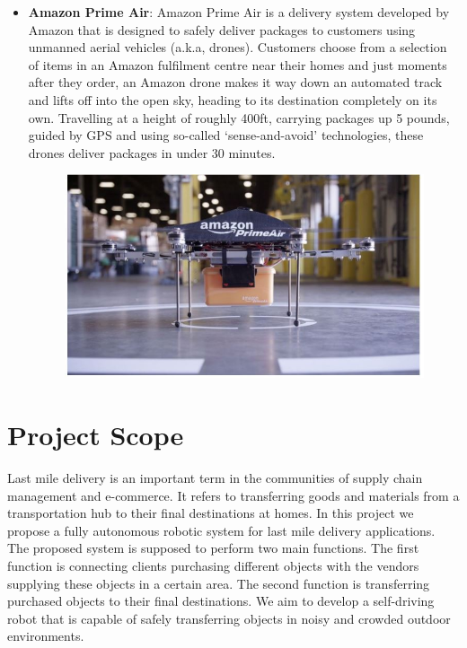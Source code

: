 \begin{itemize}
\par
 \item \textbf{Amazon Prime Air}:
Amazon Prime Air is a delivery system developed by Amazon that is designed to safely deliver packages to customers using unmanned aerial vehicles (a.k.a, drones). Customers choose from a selection of items in an Amazon fulfilment centre near their homes and just moments after they order, an Amazon drone makes it way down an automated track and lifts off into the open sky, heading to its destination completely on its own. Travelling at a height of roughly 400ft, carrying packages up 5 pounds, guided by GPS and using so-called ‘sense-and-avoid’ technologies, these drones deliver packages in under 30 minutes. \cite{web027}
\begin{figure}[H]%
    \center%
    \includegraphics[width=.5\textwidth]{images/Alaa/prime.JPG}%
  \end{figure}
\end{itemize}

\section{Project Scope}
\hspace{2cm} Last mile delivery is an important term in the communities of supply chain management and e-commerce. It refers to transferring goods and materials from a transportation hub to their final destinations at homes. In this project we propose a fully autonomous robotic system for last mile delivery applications. The proposed system is supposed to perform two main functions. The first function is connecting clients purchasing different objects with the vendors supplying these objects in a certain area. The second function is transferring purchased objects to their final destinations. We aim to develop a self-driving robot that is capable of safely transferring objects in noisy and crowded outdoor environments.

